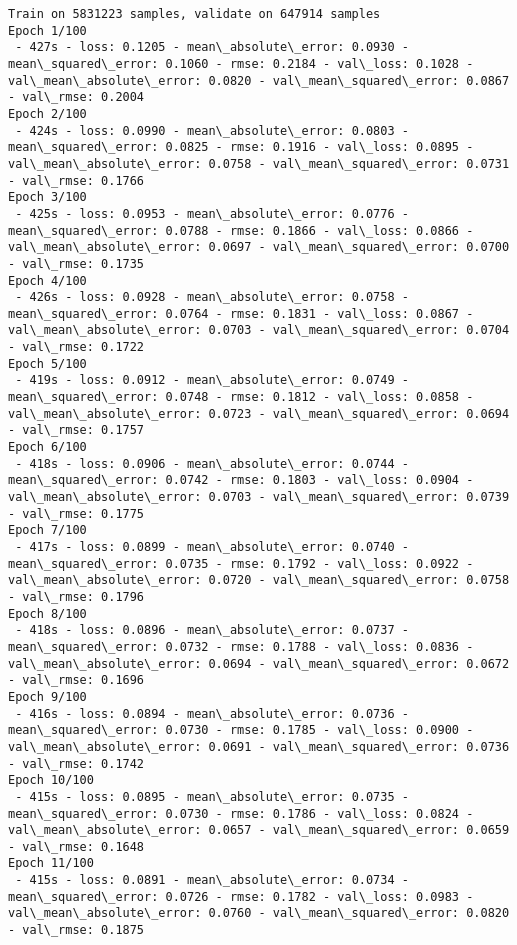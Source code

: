 \documentclass[11pt]{article}
\begin{document}
    \begin{Verbatim}[commandchars=\\\{\}]
Train on 5831223 samples, validate on 647914 samples
Epoch 1/100
 - 427s - loss: 0.1205 - mean\_absolute\_error: 0.0930 - mean\_squared\_error: 0.1060 - rmse: 0.2184 - val\_loss: 0.1028 - val\_mean\_absolute\_error: 0.0820 - val\_mean\_squared\_error: 0.0867 - val\_rmse: 0.2004
Epoch 2/100
 - 424s - loss: 0.0990 - mean\_absolute\_error: 0.0803 - mean\_squared\_error: 0.0825 - rmse: 0.1916 - val\_loss: 0.0895 - val\_mean\_absolute\_error: 0.0758 - val\_mean\_squared\_error: 0.0731 - val\_rmse: 0.1766
Epoch 3/100
 - 425s - loss: 0.0953 - mean\_absolute\_error: 0.0776 - mean\_squared\_error: 0.0788 - rmse: 0.1866 - val\_loss: 0.0866 - val\_mean\_absolute\_error: 0.0697 - val\_mean\_squared\_error: 0.0700 - val\_rmse: 0.1735
Epoch 4/100
 - 426s - loss: 0.0928 - mean\_absolute\_error: 0.0758 - mean\_squared\_error: 0.0764 - rmse: 0.1831 - val\_loss: 0.0867 - val\_mean\_absolute\_error: 0.0703 - val\_mean\_squared\_error: 0.0704 - val\_rmse: 0.1722
Epoch 5/100
 - 419s - loss: 0.0912 - mean\_absolute\_error: 0.0749 - mean\_squared\_error: 0.0748 - rmse: 0.1812 - val\_loss: 0.0858 - val\_mean\_absolute\_error: 0.0723 - val\_mean\_squared\_error: 0.0694 - val\_rmse: 0.1757
Epoch 6/100
 - 418s - loss: 0.0906 - mean\_absolute\_error: 0.0744 - mean\_squared\_error: 0.0742 - rmse: 0.1803 - val\_loss: 0.0904 - val\_mean\_absolute\_error: 0.0703 - val\_mean\_squared\_error: 0.0739 - val\_rmse: 0.1775
Epoch 7/100
 - 417s - loss: 0.0899 - mean\_absolute\_error: 0.0740 - mean\_squared\_error: 0.0735 - rmse: 0.1792 - val\_loss: 0.0922 - val\_mean\_absolute\_error: 0.0720 - val\_mean\_squared\_error: 0.0758 - val\_rmse: 0.1796
Epoch 8/100
 - 418s - loss: 0.0896 - mean\_absolute\_error: 0.0737 - mean\_squared\_error: 0.0732 - rmse: 0.1788 - val\_loss: 0.0836 - val\_mean\_absolute\_error: 0.0694 - val\_mean\_squared\_error: 0.0672 - val\_rmse: 0.1696
Epoch 9/100
 - 416s - loss: 0.0894 - mean\_absolute\_error: 0.0736 - mean\_squared\_error: 0.0730 - rmse: 0.1785 - val\_loss: 0.0900 - val\_mean\_absolute\_error: 0.0691 - val\_mean\_squared\_error: 0.0736 - val\_rmse: 0.1742
Epoch 10/100
 - 415s - loss: 0.0895 - mean\_absolute\_error: 0.0735 - mean\_squared\_error: 0.0730 - rmse: 0.1786 - val\_loss: 0.0824 - val\_mean\_absolute\_error: 0.0657 - val\_mean\_squared\_error: 0.0659 - val\_rmse: 0.1648
Epoch 11/100
 - 415s - loss: 0.0891 - mean\_absolute\_error: 0.0734 - mean\_squared\_error: 0.0726 - rmse: 0.1782 - val\_loss: 0.0983 - val\_mean\_absolute\_error: 0.0760 - val\_mean\_squared\_error: 0.0820 - val\_rmse: 0.1875

\end{Verbatim}
\end{document}

